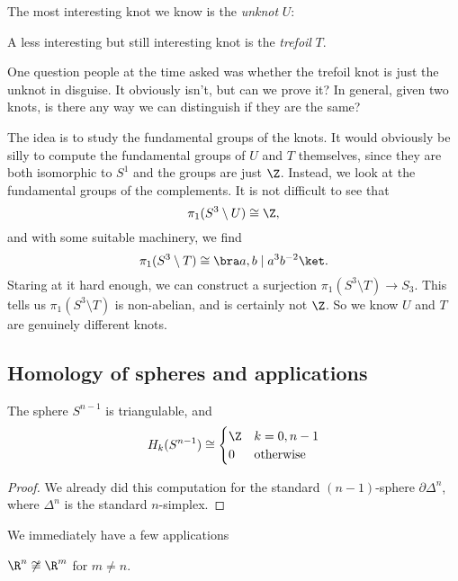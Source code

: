 \documentclass[a4paper]{article}
\begin{document}
The most interesting knot we know is the \emph{unknot} $U$:
\begin{center}
\end{center}
A less interesting but still interesting knot is the \emph{trefoil} $T$.
\begin{center}
\end{center}
One question people at the time asked was whether the trefoil knot is just the unknot in disguise. It obviously isn't, but can we prove it? In general, given two knots, is there any way we can distinguish if they are the same?

The idea is to study the fundamental groups of the knots. It would obviously be silly to compute the fundamental groups of $U$ and $T$ themselves, since they are both isomorphic to $S^1$ and the groups are just $\Z$. Instead, we look at the fundamental groups of the complements. It is not difficult to see that
\[
  \pi_1(S^3 \setminus U) \cong \Z,
\]
and with some suitable machinery, we find
\[
  \pi_1(S^3 \setminus T) \cong \bra a, b\mid a^3 b^{-2}\ket.
\]
Staring at it hard enough, we can construct a surjection $\pi_1(S^3 \setminus T) \to S_3$. This tells us $\pi_1(S^3 \setminus T)$ is non-abelian, and is certainly not $\Z$. So we know $U$ and $T$ are genuinely different knots.

\subsection{Homology of spheres and applications}

\begin{lemma}
  The sphere $S^{n - 1}$ is triangulable, and
  \[
    H_k(S^{n - 1}) \cong
    \begin{cases}
      \Z & k = 0, n - 1\\
      0 & \text{otherwise}
    \end{cases}
  \]
\end{lemma}
\begin{proof}
  We already did this computation for the standard $(n - 1)$-sphere $\partial \Delta^n$, where $\Delta^n$ is the standard $n$-simplex.
\end{proof}
We immediately have a few applications
\begin{prop}
  $\R^n \not\cong \R^m$ for $m \not= n$.
\end{prop}
\end{document}

